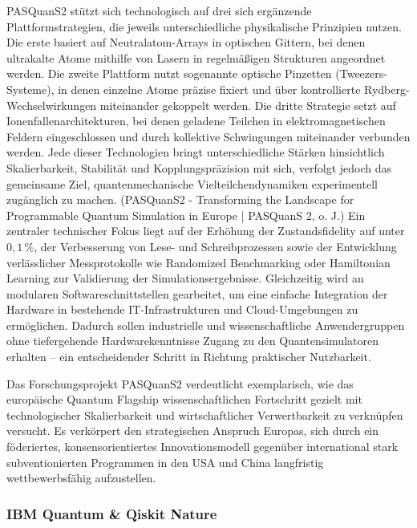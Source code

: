 PASQuanS2 stützt sich technologisch auf drei sich ergänzende Plattformstrategien, die jeweils unterschiedliche physikalische Prinzipien nutzen. Die erste basiert auf Neutralatom-Arrays in optischen Gittern, bei denen ultrakalte Atome mithilfe von Lasern in regelmäßigen Strukturen angeordnet werden. Die zweite Plattform nutzt sogenannte optische Pinzetten (Tweezers-Systeme), in denen einzelne Atome präzise fixiert und über kontrollierte Rydberg-Wechselwirkungen miteinander gekoppelt werden. Die dritte Strategie setzt auf Ionenfallenarchitekturen, bei denen geladene Teilchen in elektromagnetischen Feldern eingeschlossen und durch kollektive Schwingungen miteinander verbunden werden. Jede dieser Technologien bringt unterschiedliche Stärken hinsichtlich Skalierbarkeit, Stabilität und Kopplungspräzision mit sich, verfolgt jedoch das gemeinsame Ziel, quantenmechanische Vielteilchendynamiken experimentell zugänglich zu machen. \cite{}(PASQuanS2 - Transforming the Landscape for Programmable Quantum Simulation in Europe | PASQuanS 2, o. J.) Ein zentraler technischer Fokus liegt auf der Erhöhung der Zustandsfidelity auf unter \(0{,}1\,\%\), der Verbesserung von Lese- und Schreibprozessen sowie der Entwicklung verlässlicher Messprotokolle wie Randomized Benchmarking oder Hamiltonian Learning zur Validierung der Simulationsergebnisse. Gleichzeitig wird an modularen Softwareschnittstellen gearbeitet, um eine einfache Integration der Hardware in bestehende IT-Infrastrukturen und Cloud-Umgebungen zu ermöglichen. Dadurch sollen industrielle und wissenschaftliche Anwendergruppen ohne tiefergehende Hardwarekenntnisse Zugang zu den Quantensimulatoren erhalten – ein entscheidender Schritt in Richtung praktischer Nutzbarkeit. \citealp[6]{rasanenPathEuropeanQuantum2021}

Das Forschungsprojekt PASQuanS2 verdeutlicht exemplarisch, wie das europäische Quantum Flagship wissenschaftlichen Fortschritt gezielt mit technologischer Skalierbarkeit und wirtschaftlicher Verwertbarkeit zu verknüpfen versucht. Es verkörpert den strategischen Anspruch Europas, sich durch ein föderiertes, konsensorientiertes Innovationsmodell gegenüber international stark subventionierten Programmen in den USA und China langfristig wettbewerbsfähig aufzustellen. \citealp[7]{vogiatzoglouEUsQuestDigital2025}
 

\subsubsection*{IBM Quantum & Qiskit Nature} 

